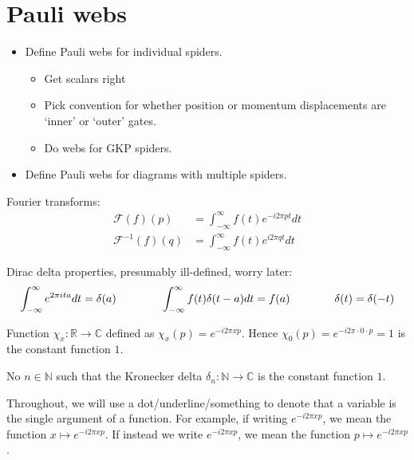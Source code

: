 \section{Pauli webs}

\begin{itemize}
    \item Define Pauli webs for individual spiders.
        \begin{itemize}
            \item Get scalars right
            \item Pick convention for whether position or momentum displacements are `inner' or `outer' gates.
            \item Do webs for GKP spiders.
        \end{itemize}
    \item Define Pauli webs for diagrams with multiple spiders.
\end{itemize}

Fourier transforms:
\begin{equation}\label{eq:fourier_transforms_defn}
    \begin{aligned}
        \mathcal{F}(f)(p) &= \int_{-\infty}^{\infty} f(t) e^{-i 2 \pi p t} d t \\[5pt]
        \mathcal{F}^{-1}(f)(q) &= \int_{-\infty}^{\infty} f(t) e^{i 2 \pi q t} d t
    \end{aligned}
\end{equation}

Dirac delta properties, presumably ill-defined, worry later:
\begin{equation}\label{eq:dirac_delta_properties}
    \int_{-\infty}^{\infty} e^{2 \pi i t a} dt = \delta(a)
    \quad\quad\qquad
    \int_{-\infty}^{\infty} f(t) \delta(t-a) dt = f(a)
    \quad\quad\qquad
    \delta(t) = \delta(-t)
\end{equation}

Function $\chi_x : \mathbb{R} \to \mathbb{C}$ defined as $\chi_x(p) = e^{-i2\pi xp}$.
Hence $\chi_0(p) = e^{-i2\pi \cdot 0 \cdot p} = 1$ is the constant function $1$.

No $n \in \mathbb{N}$ such that the Kronecker delta $\delta_n: \mathbb{N} \to \mathbb{C}$ is the constant function $1$.

Throughout, we will use a dot/underline/something to denote that a variable is the single argument of a function.
For example, if writing $e^{-i2\pi \dot{x}p}$, we mean the function $x \mapsto e^{-i2\pi xp}$.
If instead we write $e^{-i2\pi x\dot{p}}$, we mean the function $p \mapsto e^{-i2\pi xp}$.

